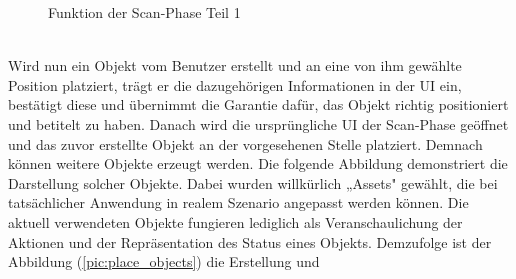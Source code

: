 \begin{figure}[hbt!]
    \centering
    \caption{Funktion der Scan-Phase Teil 1}
    \label{pic:markerTracking}
\end{figure} 
\\ 
Wird nun ein Objekt vom Benutzer erstellt und an eine von ihm gewählte Position platziert, trägt er die dazugehörigen Informationen in der \acs{UI} 
ein, bestätigt diese und übernimmt die Garantie dafür, das Objekt richtig positioniert und betitelt zu haben. Danach wird die ursprüngliche \acs{UI} der Scan-Phase 
geöffnet und das zuvor erstellte Objekt an der vorgesehenen 
Stelle platziert. Demnach können weitere Objekte erzeugt werden. Die folgende Abbildung demonstriert die Darstellung solcher Objekte. Dabei wurden willkürlich 
„Assets" gewählt, die bei tatsächlicher Anwendung in realem Szenario angepasst werden können. Die aktuell verwendeten Objekte fungieren lediglich als 
Veranschaulichung der Aktionen und der Repräsentation des Status eines Objekts. Demzufolge ist der Abbildung (\ref{pic:place_objects}) die Erstellung und 
